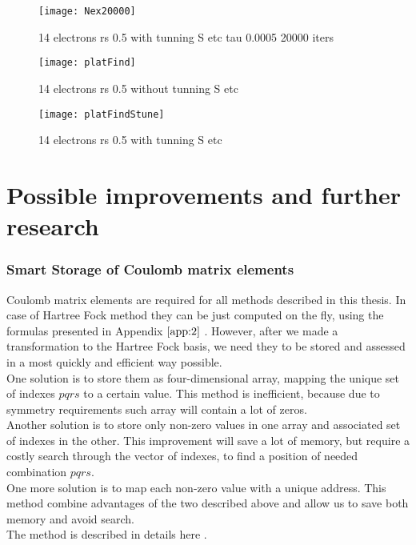 \documentclass[twoside,english]{uiofysmaster}
\theoremstyle{definition}
\begin{document}
\begin{figure}[ht!]
	\centering
	\texttt{[image: Nex20000]}
	\caption{14 electrons rs 0.5 with tunning S etc tau 0.0005 20000 iters}
	\label{fig:nx20k}
\end{figure}





\begin{landscape}
	
	\begin{figure}[ht!]
		\centering
		\texttt{[image: platFind]}
		\caption{14 electrons rs 0.5 without tunning S etc }
		\label{fig:platFind}
	\end{figure}
	
\end{landscape}

\begin{landscape}
	
	\begin{figure}[ht!]
		\centering
		\texttt{[image: platFindStune]}
		\caption{14 electrons rs 0.5 with tunning S etc }
		\label{fig:platFindStune}
	\end{figure}
	
\end{landscape}


\part{Possible improvements and further research}

\section{Smart Storage of Coulomb matrix elements}
Coulomb matrix elements are required for all methods described in this thesis. In case of Hartree Fock method they can be just computed on the fly, using the formulas presented in Appendix $\ref{app:2}$ . However, after we made a transformation to the Hartree Fock basis, we need they to be stored and assessed in a most quickly and efficient way possible. \\
One solution is to store them as four-dimensional array, mapping the unique set of indexes $pqrs$ to a certain value. This method is inefficient, because due to symmetry requirements such array will contain a lot of zeros.\\
Another solution is to store only non-zero values in one array and associated set of indexes  in the other. This improvement will save a lot of memory, but require a costly search through the vector of indexes, to find a position of needed combination $pqrs$.\\
One more solution is to map each non-zero value with a unique address. This method combine advantages of the two described above and allow us to save both memory and avoid search.\\
The method is described in details here \cite{leikangerFullConfigurationInteraction}.
\end{document}

